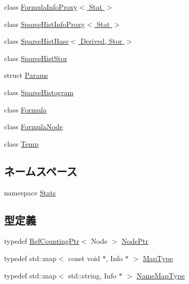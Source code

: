 \begin{DoxyCompactItemize}
class \hyperlink{classStats_1_1FormulaInfoProxy}{FormulaInfoProxy$<$ Stat $>$}
\item 
class \hyperlink{classStats_1_1SparseHistInfoProxy}{SparseHistInfoProxy$<$ Stat $>$}
\item 
class \hyperlink{classStats_1_1SparseHistBase}{SparseHistBase$<$ Derived, Stor $>$}
\item 
class \hyperlink{classStats_1_1SparseHistStor}{SparseHistStor}
\item 
struct \hyperlink{structStats_1_1SparseHistStor_1_1Params}{Params}
\item 
class \hyperlink{classStats_1_1SparseHistogram}{SparseHistogram}
\item 
class \hyperlink{classStats_1_1Formula}{Formula}
\item 
class \hyperlink{classStats_1_1FormulaNode}{FormulaNode}
\item 
class \hyperlink{classStats_1_1Temp}{Temp}
\end{DoxyCompactItemize}
\subsection*{ネームスペース}
\begin{DoxyCompactItemize}
\item 
namespace \hyperlink{namespaceStats}{Stats}
\end{DoxyCompactItemize}
\subsection*{型定義}
\begin{DoxyCompactItemize}
\item 
typedef \hyperlink{classRefCountingPtr}{RefCountingPtr}$<$ Node $>$ \hyperlink{namespaceStats_aa88307dbf1a45aa2d5760fbfe45e2000}{NodePtr}
\item 
typedef std::map$<$ const void $\ast$, Info $\ast$ $>$ \hyperlink{namespaceStats_a2cc2598bf16648653f0799b7dd5b5098}{MapType}
\item 
typedef std::map$<$ std::string, Info $\ast$ $>$ \hyperlink{namespaceStats_a45a78e2268e9f18065a10879d43f0db4}{NameMapType}
\end{DoxyCompactItemize}

